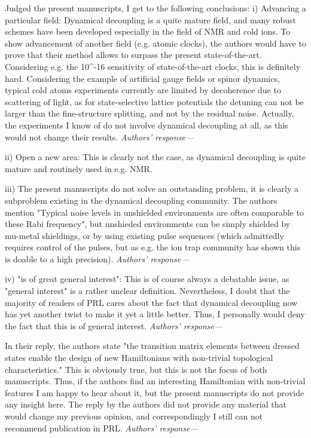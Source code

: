 \documentclass[letterpaper]{article}
\newenvironment{refcomment}{\singlespacing\verbatim}{\endverbatim}
\newcommand{\response}{\emph{Authors' response---}}
\begin{document}
\begin{refcomment}
Judged the present manuscripts, I get to the following conclusions: i)
Advancing a particular field: Dynamical decoupling is a quite mature
field, and many robust schemes have been developed especially in the
field of NMR and cold ions. To show advancement of another field (e.g.
atomic clocks), the authors would have to prove that their method
allows to surpass the present state-of-the-art. Considering e.g. the
10^-16 sensitivity of state-of-the-art clocks, this is definitely
hard. Considering the example of artificial gauge fields or spinor
dynamics, typical cold atoms experiments currently are limited by
decoherence due to scattering of light, as for state-selective lattice
potentials the detuning can not be larger than the fine-structure
splitting, and not by the residual noise. Actually, the experiments I
know of do not involve dynamical decoupling at all, as this would not
change their results.
\end{refcomment}
\response


\begin{refcomment}
ii) Open a new area: This is clearly not the case, as dynamical
decoupling is quite mature and routinely used in e.g. NMR.

iii) The present manuscripts do not solve an outstanding problem, it
is clearly a subproblem existing in the dynamical decoupling
community. The authors mention "Typical noise levels in
unshielded environments are often comparable to these
Rabi frequency", but unshieded environments can be simply shielded
by mu-metal shieldings, or by using existing pulse sequences (which
admittedly requires control of the pulses, but as e.g. the ion trap
community has shown this is doable to a high precision).
\end{refcomment}
\response


\begin{refcomment}
iv) "is of great general interest": This is of course always a
debatable issue, as "general interest" is a rather unclear definition.
Nevertheless, I doubt that the majority of readers of PRL cares about
the fact that dynamical decoupling now has yet another twist to make
it yet a little better. Thus, I personally would deny the fact that
this is of general interest.
\end{refcomment}
\response


\begin{refcomment}
In their reply, the authors state "the transition matrix
elements between dressed states enable the design of
new Hamiltonians with non-trivial topological 
characteristics." This is obviously true, but this is not the focus
of both manuscripts. Thus, if the authors find an interesting
Hamiltonian with non-trivial features I am happy to hear about it, but
the present manuscripts do not provide any insight here. The reply by
the authors did not provide any material that would change my previous
opinion, and correspondingly I still can not recommend publication in
PRL.
\end{refcomment}
\response
\end{document}
